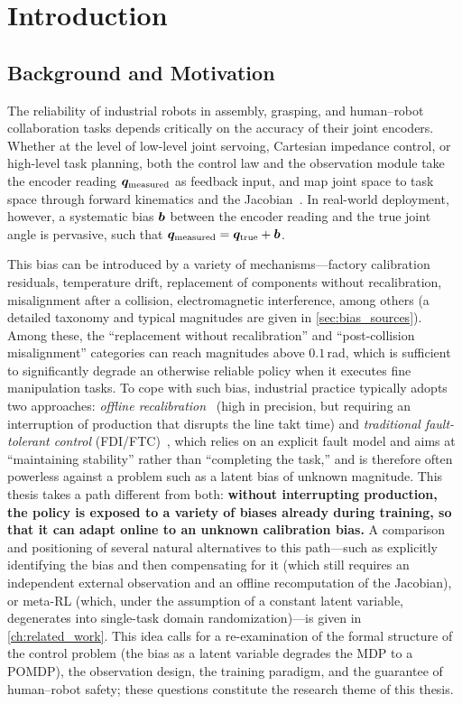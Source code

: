 
\chapter{Introduction}\label{ch:introduction}

\section{Background and Motivation}\label{sec:background}

The reliability of industrial robots in assembly, grasping, and human--robot collaboration tasks depends critically on the accuracy of their joint encoders. Whether at the level of low-level joint servoing, Cartesian impedance control, or high-level task planning, both the control law and the observation module take the encoder reading $\bm{q}_{\text{measured}}$ as feedback input, and map joint space to task space through forward kinematics and the Jacobian~\cite{siciliano2010robotics}. In real-world deployment, however, a systematic bias $\bm{b}$ between the encoder reading and the true joint angle is pervasive, such that $\bm{q}_{\text{measured}} = \bm{q}_{\text{true}} + \bm{b}$.

This bias can be introduced by a variety of mechanisms---factory calibration residuals, temperature drift, replacement of components without recalibration, misalignment after a collision, electromagnetic interference, among others (a detailed taxonomy and typical magnitudes are given in \cref{sec:bias_sources}). Among these, the ``replacement without recalibration'' and ``post-collision misalignment'' categories can reach magnitudes above $0.1$\,rad, which is sufficient to significantly degrade an otherwise reliable policy when it executes fine manipulation tasks. To cope with such bias, industrial practice typically adopts two approaches: \emph{offline recalibration}~\cite{kana2022fast,gong2000nongeometric} (high in precision, but requiring an interruption of production that disrupts the line takt time) and \emph{traditional fault-tolerant control} (FDI/FTC)~\cite{blanke2016diagnosis}, which relies on an explicit fault model and aims at ``maintaining stability'' rather than ``completing the task,'' and is therefore often powerless against a problem such as a latent bias of unknown magnitude. This thesis takes a path different from both: \textbf{without interrupting production, the policy is exposed to a variety of biases already during training, so that it can adapt online to an unknown calibration bias.} A comparison and positioning of several natural alternatives to this path---such as explicitly identifying the bias and then compensating for it (which still requires an independent external observation and an offline recomputation of the Jacobian), or meta-RL (which, under the assumption of a constant latent variable, degenerates into single-task domain randomization)---is given in \cref{ch:related_work}. This idea calls for a re-examination of the formal structure of the control problem (the bias as a latent variable degrades the MDP to a POMDP), the observation design, the training paradigm, and the guarantee of human--robot safety; these questions constitute the research theme of this thesis.

